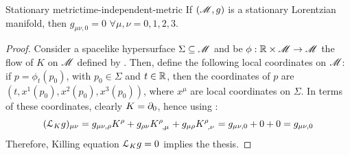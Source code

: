 \begin{proposition}{Stationary metric}{time-independent-metric}
  If $ (\mathscr{M} , g) $ is a stationary Lorentzian manifold, then $ g_{\mu \nu , 0} = 0 \,\, \forall \mu , \nu = 0,1,2,3 $.
\end{proposition}

\begin{proofbox}
  \begin{proof}
    Consider a spacelike hypersurface $ \Sigma \subseteq \mathscr{M} $ and be $ \phi : \mathbb{R} \times \mathscr{M} \rightarrow \mathscr{M} $ the flow of $ K $ on $ \mathscr{M} $ defined by . Then, define the following local coordinates on $ \mathscr{M} $: if $ p = \phi_t(p_0) $, with $ p_0 \in \Sigma $ and $ t \in \mathbb{R} $, then the coordinates of $ p $ are $ (t , x^1(p_0) , x^2(p_0) , x^3(p_0)) $, where $ x^\mu $ are local coordinates on $ \Sigma $. In terms of these coordinates, clearly $ K = \partial_0 $, hence using :
    \begin{equation*}
      (\ld_K g)_{\mu \nu} = g_{\mu \nu , \rho} K^\rho + g_{\rho \nu} \tensor{K}{^\rho_{,\mu}} + g_{\mu \rho} \tensor{K}{^\rho_{,\nu}} = g_{\mu \nu , 0} + 0 + 0 = g_{\mu \nu , 0}
    \end{equation*}
    Therefore, Killing equation $ \EuScript{L}_K g = 0 $ implies the thesis.
  \end{proof}
\end{proofbox}

